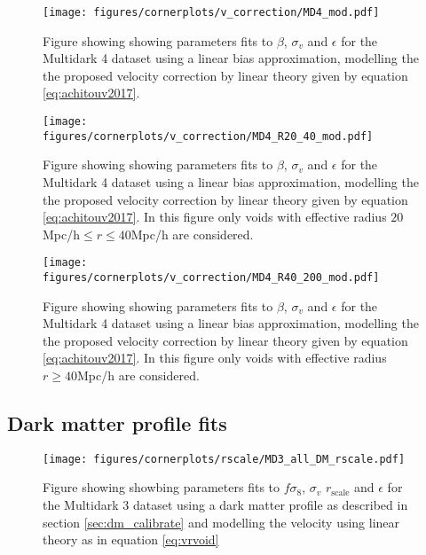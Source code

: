 \begin{figure}[htbp]\label{fig:linbiasMD4mod}
    \texttt{[image: figures/cornerplots/v\_correction/MD4\_mod.pdf]}
    \caption{Figure showing showing parameters fits to $\beta$, $\sigma_v$ and $\epsilon$ for the Multidark 4 dataset using a linear bias approximation, modelling the the proposed velocity correction by \cite{Achitouv_streaming} linear theory given by equation \ref{eq:achitouv2017}.}
\end{figure}

\begin{figure}[htbp]\label{fig:linbiasMD4modR2040}
    \texttt{[image: figures/cornerplots/v\_correction/MD4\_R20\_40\_mod.pdf]}
    \caption{Figure showing showing parameters fits to $\beta$, $\sigma_v$ and $\epsilon$ for the Multidark 4 dataset using a linear bias approximation, modelling the the proposed velocity correction by \cite{Achitouv_streaming} linear theory given by equation \ref{eq:achitouv2017}. In this figure only voids with effective radius $20$Mpc/h$\leq r \leq 40$Mpc/h are considered.}
\end{figure}

\begin{figure}[htbp]\label{fig:linbiasMD4modR40}
    \texttt{[image: figures/cornerplots/v\_correction/MD4\_R40\_200\_mod.pdf]}
    \caption{Figure showing showing parameters fits to $\beta$, $\sigma_v$ and $\epsilon$ for the Multidark 4 dataset using a linear bias approximation, modelling the the proposed velocity correction by \cite{Achitouv_streaming} linear theory given by equation \ref{eq:achitouv2017}. In this figure only voids with effective radius $r \geq 40$Mpc/h are considered.}
\end{figure}

\subsection{Dark matter profile fits}

\begin{figure}[htbp]\label{fig:linbiasMD3DM}
    \texttt{[image: figures/cornerplots/rscale/MD3\_all\_DM\_rscale.pdf]}
    \caption{Figure showing showbing parameters fits to $f\sigma_8$, $\sigma_v$ $r_{\mathrm{scale}}$ and $\epsilon$ for the Multidark 3 dataset using a dark matter profile as described in section \ref{sec:dm_calibrate} and modelling the velocity using linear theory as in equation \ref{eq:vrvoid}}
\end{figure}

